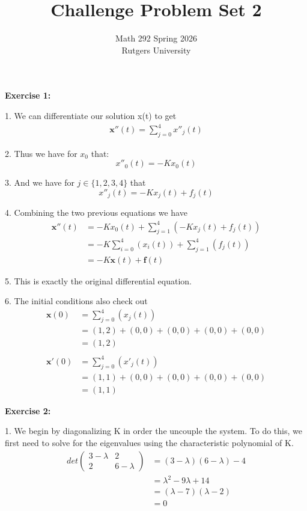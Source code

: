 \documentclass[12pt]{article}
\title{Challenge Problem Set 2}
\author{Math 292 Spring 2026 \\ Rutgers University}
\date{}
\begin{document}
\maketitle{}

\noindent{}\textbf{Exercise 1:}

1. We can differentiate our solution x(t) to get
\begin{align*}
    \mathbf{x}''(t) = \sum_{j=0}^4{x''_j(t)}
\end{align*}

2. Thus we have for $x_0$ that:
\[
    x''_0(t) = -Kx_0(t)
\]

3. And we have for $j \in\{1,2,3,4\}$ that
\[
    x''_j(t) = -Kx_j(t) + f_j(t)
\]

4. Combining the two previous equations we have
\begin{align*}
    \mathbf{x}''(t) & = -Kx_0(t) + \sum_{j=1}^4(-Kx_j(t) + f_j(t))    \\
                    & = -K\sum_{i=0}^4(x_i(t)) + \sum_{j=1}^4(f_j(t)) \\
                    & = -K\mathbf{x}(t) + \mathbf{f}(t)
\end{align*}

5. This is exactly the original differential equation.

6. The initial conditions also check out
\begin{align*}
    \mathbf{x}(0)  & = \sum_{j=0}^4(x_j(t))                   \\
                   & = (1,2 ) + (0,0) + (0,0) + (0,0) + (0,0) \\
                   & = (1,2)                                  \\\\
    \mathbf{x}'(0) & = \sum_{j=0}^4 (x'_j(t))                 \\
                   & = (1,1) + (0,0) + (0,0) + (0,0) + (0,0)  \\
                   & = (1,1)
\end{align*}

\newpage{}

\noindent{}\textbf{Exercise 2:}

1. We begin by diagonalizing K in order the uncouple the system. To do this, we first need to solve for the eigenvalues using the characteristic polynomial of K.
\begin{align*}
    det\begin{pmatrix} 3 - \lambda{} & 2 \\ 2 & 6 - \lambda{}\end{pmatrix} & = (3-\lambda{})(6-\lambda{}) - 4 \\
                                                                           & = \lambda^{2} -9\lambda{} + 14   \\
                                                                           & = (\lambda{} - 7)(\lambda{} - 2) \\
                                                                           & = 0
\end{align*}
\end{document}
